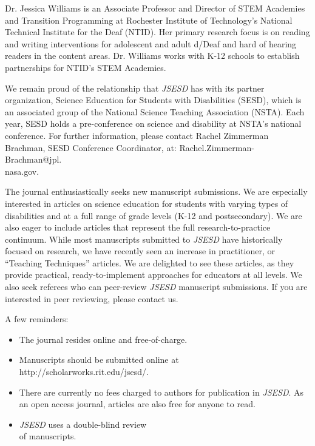 \documentclass[11pt]{sig-alternate}
\begin{document}
\begin{large}
Dr. Jessica Williams is an Associate Professor and Director of STEM Academies and Transition Programming at Rochester Institute of Technology’s National Technical Institute for the Deaf (NTID). Her primary research focus is on reading and writing interventions for adolescent and adult d/Deaf and hard of hearing readers in the content areas. Dr. Williams works with K-12 schools to establish partnerships for NTID’s STEM Academies. 

We remain proud of the relationship that \textit{JSESD} has with its partner organization, Science Education for Students with Disabilities (SESD), which is an associated group of the National Science Teaching Association (NSTA).  Each year, SESD holds a pre-conference on science and disability at NSTA’s national conference.  For further information, please contact Rachel Zimmerman Brachman, SESD Conference Coordinator, at: Rachel.Zimmerman-Brachman@jpl.\\nasa.gov.

The journal enthusiastically seeks new manuscript submissions.  We are especially interested in articles on science education for students with varying types of disabilities and at a full range of grade levels (K-12 and postsecondary).  We are also eager to include articles that represent the full research-to-practice continuum. While most manuscripts submitted to \textit{JSESD} have historically focused on research, we have recently seen an increase in practitioner, or “Teaching Techniques” articles.  We are delighted to see these articles, as they provide practical, ready-to-implement approaches for educators at all levels.  We also seek referees who can peer-review \textit{JSESD} manuscript submissions.  If you are interested in peer reviewing, please contact us.


A few reminders:
\begin{itemize}
	\item The journal resides online and free-of-charge.
    \item Manuscripts should be submitted online at http://scholarworks.rit.edu/jsesd/. 
    \item There are currently no fees charged to authors for publication in \textit{JSESD}.  As an open access journal, articles are also free for anyone to read.
    \item \textit{JSESD} uses a double-blind review \\of manuscripts.
\end{itemize}


\end{large}
\end{document}
